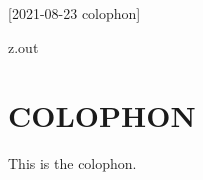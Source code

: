 [2021-08-23 colophon]

\begin{VerbatimOut}{z.out}
\chapter*{COLOPHON}
\label{ap:colophon}


This is the colophon.

\end{VerbatimOut}

\MyIO
